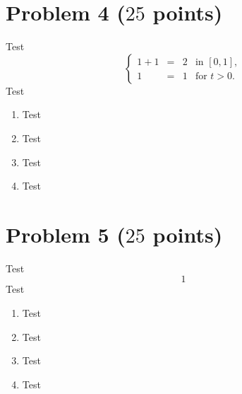 \documentclass[a4paper]{article}%
\begin{document}
\clearpage %

\clearpage %

\clearpage
{}\clearpage %











\section*{Problem 4 ($25$ points)} 
Test
\begin{equation*}
  \left\{
  \begin{array}{rcll}
    1         +  1 & = & 2   & \mbox{in } [0,1],   
    \\
    1                                  & = & 1   & \mbox{for } t > 0.
  \end{array}
  \right.
\end{equation*}
Test

\begin{enumerate}[label=(\alph*)]
  \item 
  Test
  \item
  Test
  \item 
  Test
  \item 
  Test
\end{enumerate}

\clearpage %

\clearpage %

\clearpage
{}\clearpage %








\section*{Problem 5 ($25$ points)} 
Test 
\begin{equation*}
  1
\end{equation*}
Test

\begin{enumerate}[label=(\alph*)]
  \item 
  Test
  \item
  Test
  \item 
  Test
  \item 
  Test
\end{enumerate}
\end{document}
